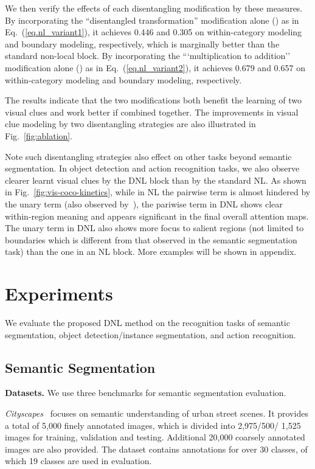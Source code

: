 \documentclass[runningheads]{llncs}
\begin{document}
We then verify the effects of each disentangling modification by these measures. By incorporating the ``disentangled transformation'' modification alone () as in Eq.~(\ref{eq.nl_variant1}), it achieves 0.446 and 0.305 on within-category modeling and boundary modeling, respectively, which is marginally better than the standard non-local block. By incorporating the ```multiplication to addition'' modification alone () as in Eq.~(\ref{eq.nl_variant2}), it achieves 0.679 and 0.657 on within-category modeling and boundary modeling, respectively.

The results indicate that the two modifications both benefit the learning of two visual clues and work better if combined together. The improvements in visual clue modeling by two disentangling strategies are also illustrated in Fig.~\ref{fig:ablation}.

Note such disentangling strategies also effect on other tasks beyond semantic segmentation. In object detection and action recognition tasks, we also observe clearer learnt visual clues by the DNL block than by the standard NL. As shown in Fig.~\ref{fig:vis-coco-kinetics}, while in NL the pairwise term is almost hindered by the unary term (also observed by~\cite{cao2019gcnet}), the pariwise term in DNL shows clear within-region meaning and appears significant in the final overall attention maps. The unary term in DNL also shows more focus to salient regions (not limited to boundaries which is different from that observed in the semantic segmentation task) than the one in an NL block. More examples will be shown in appendix.

\section{Experiments}

We evaluate the proposed DNL method on the recognition tasks of semantic segmentation, object detection/instance segmentation, and action recognition.

\subsection{Semantic Segmentation}

\label{sec.semantic_seg}

\textbf{Datasets.} We use three benchmarks for semantic segmentation evaluation.

\emph{Cityscapes}~\cite{cordts2016cityscapes} focuses on semantic understanding of urban street scenes. It provides a total of 5,000 finely annotated images, which is divided into 2,975/500/ 1,525 images for training, validation and testing. Additional 20,000 coarsely annotated images are also provided. The dataset contains annotations for over 30 classes, of which 19 classes are used in evaluation.
\end{document}
